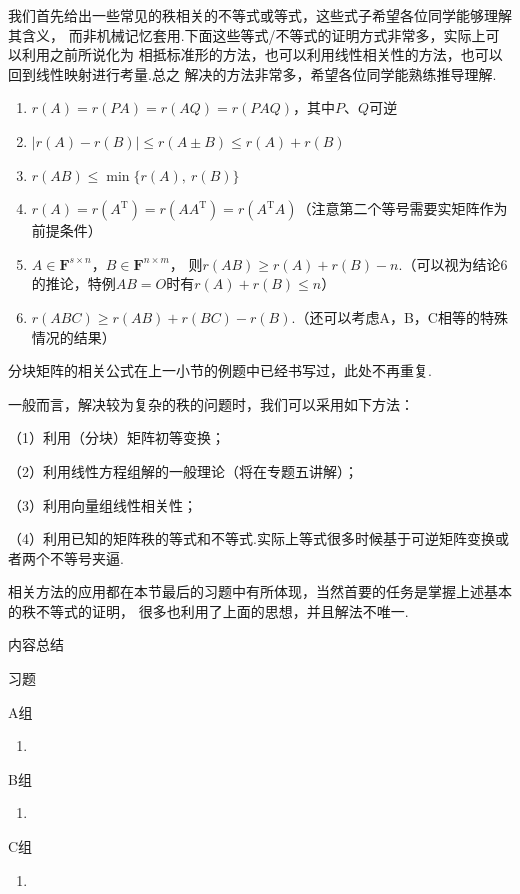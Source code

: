 我们首先给出一些常见的秩相关的不等式或等式，这些式子希望各位同学能够理解其含义，
而非机械记忆套用.下面这些等式/不等式的证明方式非常多，实际上可以利用之前所说化为
相抵标准形的方法，也可以利用线性相关性的方法，也可以回到线性映射进行考量.总之
解决的方法非常多，希望各位同学能熟练推导理解.
\begin{enumerate}
	\item $r(A)=r(PA)=r(AQ)=r(PAQ)$，其中$P$、$Q$可逆
	\item $|r(A)-r(B)|\le r(A\pm B) \le r(A)+r(B)$
	\item $r(AB) \le \min\{r(A),\ r(B)\}$
	\item $r(A)=r(A^\mathrm{T})=r(AA^\mathrm{T})=r(A^\mathrm{T}A)$（注意第二个等号需要实矩阵作为前提条件）
	\item $A \in \mathbf{F}^{s \times n}$，$B \in \mathbf{F}^{n \times m}$，
	则$r(AB) \ge r(A)+r(B)-n$.（可以视为结论6的推论，特例$AB=O$时有$r(A)+r(B)\le n$）
	\item $r(ABC) \ge r(AB)+r(BC)-r(B)$.（还可以考虑A，B，C相等的特殊情况的结果）
\end{enumerate}

分块矩阵的相关公式在上一小节的例题中已经书写过，此处不再重复.

一般而言，解决较为复杂的秩的问题时，我们可以采用如下方法：

（1）利用（分块）矩阵初等变换；

（2）利用线性方程组解的一般理论（将在专题五讲解）；

（3）利用向量组线性相关性；

（4）利用已知的矩阵秩的等式和不等式.实际上等式很多时候基于可逆矩阵变换或者两个不等号夹逼.

相关方法的应用都在本节最后的习题中有所体现，当然首要的任务是掌握上述基本的秩不等式的证明，
很多也利用了上面的思想，并且解法不唯一.

\vspace{2ex} 
\centerline{\heiti \Large 内容总结}

\vspace{2ex} 

\centerline{\heiti \Large 习题}
\vspace{2ex} 
{\kaishu }
\begin{flushright}
    \kaishu

\end{flushright}
\centerline{\heiti A组}
\begin{enumerate}
	\item 
\end{enumerate}
\centerline{\heiti B组}
\begin{enumerate}
	\item 
\end{enumerate}
\centerline{\heiti C组}
\begin{enumerate}
	\item 
\end{enumerate}